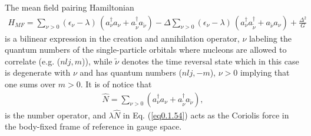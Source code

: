  The mean field pairing Hamiltonian 
\begin{align}\label{eq0.1.54}
H_{MF}=\sum_{\nu>0}(\epsilon_\nu-\lambda)\,(a^\dagger_\nu a_\nu+a^\dagger_{\tilde\nu} a_{\tilde\nu})-\Delta\sum_{\nu>0}(\epsilon_\nu-\lambda)\,(a^\dagger_\nu a^\dagger_{\tilde\nu}+a_{\tilde\nu} a_{\nu})+\frac{\Delta^2}{G}
\end{align}
is a bilinear expression in the creation and annihilation operator, $\nu$ labeling the quantum numbers of the single-particle orbitals where nucleons are allowed to correlate (e.g. ($nlj,m$)), while $\tilde \nu$ denotes the time reversal state which in this case is degenerate with $\nu$ and has quantum numbers ($nlj,-m$), $\nu>0$ implying that one sums over $m>0$. It is of notice that 
\begin{align}\label{eq0.1.55}
\hat N=\sum_{\nu>0}(a^\dagger_\nu a_\nu+a^\dagger_{\tilde\nu} a_{\tilde\nu}),
\end{align}
is the number operator, and $\lambda \hat N$ in Eq. (\ref{eq0.1.54}) acts as the Coriolis force in the body-fixed frame of reference in gauge space. 

